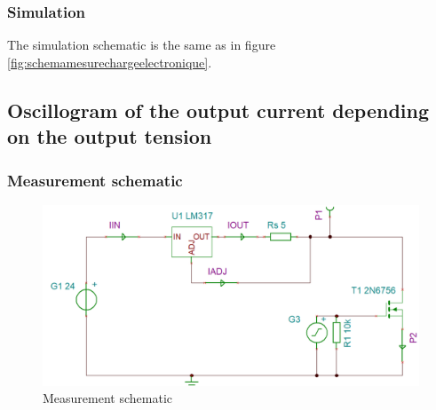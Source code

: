 {\subsubsection{Simulation}

The simulation schematic is the same as in figure \ref{fig:schemamesurechargeelectronique}.



}

\newpage
\subsection{Oscillogram of the output current depending on the output tension} \label{ssec:num13}
{
	
\subsubsection{Measurement schematic}
\begin{figure}[h]
	\centering
	\includegraphics[width=0.8\linewidth]{../../schemaMesurePulses}
	\caption{Measurement schematic}
	\label{fig:schemamesurepulses}
\end{figure}


}
\clearpage

